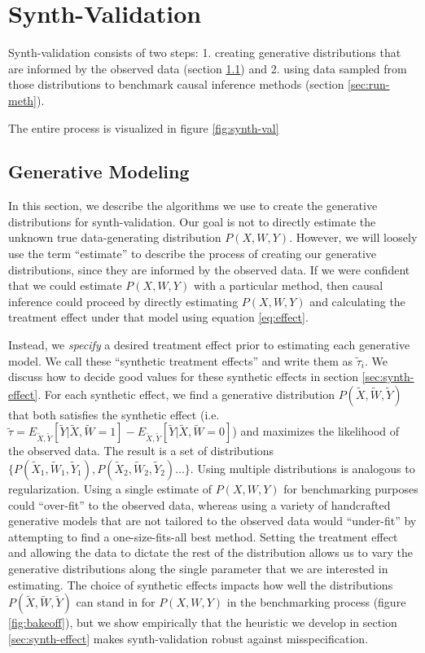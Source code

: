 \section{Synth-Validation}
\label{sec:algo}

Synth-validation consists of two steps: 1. creating generative distributions that are informed by the observed data (section \ref{sec:gen-model}) and 2. using data sampled from those distributions to benchmark causal inference methods (section \ref{sec:run-meth}). 

The entire process is visualized in figure \ref{fig:synth-val}

\subsection{Generative Modeling} 
\label{sec:gen-model}

In this section, we describe the algorithms we use to create the generative distributions for synth-validation. Our goal is not to directly estimate the unknown true data-generating distribution $P(X,W,Y)$. However, we will loosely use the term ``estimate'' to describe the process of creating our generative distributions, since they are informed by the observed data. If we were confident that we could estimate $P(X,W,Y)$ with a particular method, then causal inference could proceed by directly estimating $P(X,W,Y)$ and calculating the treatment effect under that model using equation \ref{eq:effect}.

Instead, we \emph{specify} a desired treatment effect prior to estimating each generative model. We call these ``synthetic treatment effects'' and write them as $\tilde{\tau}_i$. We discuss how to decide good values for these synthetic effects in section \ref{sec:synth-effect}. For each synthetic effect, we find a generative distribution $P(\tilde X, \tilde W, \tilde Y)$ that both satisfies the synthetic effect (i.e. $\tilde\tau = E_{\tilde X,\tilde Y}[\tilde Y| \tilde X, \tilde W=1] - E_{\tilde X,\tilde Y}[\tilde Y| \tilde X, \tilde W=0]$) and maximizes the likelihood of the observed data. The result is a set of distributions $\{P(\tilde X_1, \tilde W_1, \tilde Y_1), P(\tilde X_2, \tilde W_2, \tilde Y_2) \dots\}$. Using multiple distributions is analogous to regularization. Using a single estimate of $P(X,W,Y)$ for benchmarking purposes could ``over-fit'' to the observed data, whereas using a variety of handcrafted generative models that are not tailored to the observed data would ``under-fit'' by attempting to find a one-size-fits-all best method. Setting the treatment effect and allowing the data to dictate the rest of the distribution allows us to vary the generative distributions along the single parameter that we are interested in estimating. The choice of synthetic effects impacts how well the distributions $P(\tilde X, \tilde W, \tilde Y)$ can stand in for $P(X, W, Y)$ in the benchmarking process (figure \ref{fig:bakeoff}), but we show empirically that the heuristic we develop in section \ref{sec:synth-effect} makes synth-validation robust against misspecification.


